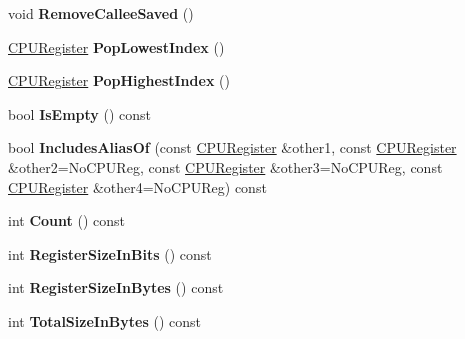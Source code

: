 \begin{DoxyCompactItemize}
\item 
void {\bfseries Remove\+Callee\+Saved} ()\hypertarget{classv8_1_1internal_1_1_c_p_u_reg_list_a2678bdb9c6393a3082b004124ca7b650}{}\label{classv8_1_1internal_1_1_c_p_u_reg_list_a2678bdb9c6393a3082b004124ca7b650}

\item 
\hyperlink{structv8_1_1internal_1_1_c_p_u_register}{C\+P\+U\+Register} {\bfseries Pop\+Lowest\+Index} ()\hypertarget{classv8_1_1internal_1_1_c_p_u_reg_list_a867b629b4d0a55fe464cf3c2daca8d3c}{}\label{classv8_1_1internal_1_1_c_p_u_reg_list_a867b629b4d0a55fe464cf3c2daca8d3c}

\item 
\hyperlink{structv8_1_1internal_1_1_c_p_u_register}{C\+P\+U\+Register} {\bfseries Pop\+Highest\+Index} ()\hypertarget{classv8_1_1internal_1_1_c_p_u_reg_list_a4f0b78f3f4844b520caba599d0860d81}{}\label{classv8_1_1internal_1_1_c_p_u_reg_list_a4f0b78f3f4844b520caba599d0860d81}

\item 
bool {\bfseries Is\+Empty} () const \hypertarget{classv8_1_1internal_1_1_c_p_u_reg_list_ac7b3fea9ac25a2f94e245eb264c23004}{}\label{classv8_1_1internal_1_1_c_p_u_reg_list_ac7b3fea9ac25a2f94e245eb264c23004}

\item 
bool {\bfseries Includes\+Alias\+Of} (const \hyperlink{structv8_1_1internal_1_1_c_p_u_register}{C\+P\+U\+Register} \&other1, const \hyperlink{structv8_1_1internal_1_1_c_p_u_register}{C\+P\+U\+Register} \&other2=No\+C\+P\+U\+Reg, const \hyperlink{structv8_1_1internal_1_1_c_p_u_register}{C\+P\+U\+Register} \&other3=No\+C\+P\+U\+Reg, const \hyperlink{structv8_1_1internal_1_1_c_p_u_register}{C\+P\+U\+Register} \&other4=No\+C\+P\+U\+Reg) const \hypertarget{classv8_1_1internal_1_1_c_p_u_reg_list_a0546665669cfa82df59de2611f737d8e}{}\label{classv8_1_1internal_1_1_c_p_u_reg_list_a0546665669cfa82df59de2611f737d8e}

\item 
int {\bfseries Count} () const \hypertarget{classv8_1_1internal_1_1_c_p_u_reg_list_ae73f91faefc58e15f84fc7b7feda10f9}{}\label{classv8_1_1internal_1_1_c_p_u_reg_list_ae73f91faefc58e15f84fc7b7feda10f9}

\item 
int {\bfseries Register\+Size\+In\+Bits} () const \hypertarget{classv8_1_1internal_1_1_c_p_u_reg_list_ac59b40b82ac0b0d65812ef6d1af2f03b}{}\label{classv8_1_1internal_1_1_c_p_u_reg_list_ac59b40b82ac0b0d65812ef6d1af2f03b}

\item 
int {\bfseries Register\+Size\+In\+Bytes} () const \hypertarget{classv8_1_1internal_1_1_c_p_u_reg_list_a0b86be40d0a6852138d39b4de5c1a931}{}\label{classv8_1_1internal_1_1_c_p_u_reg_list_a0b86be40d0a6852138d39b4de5c1a931}

\item 
int {\bfseries Total\+Size\+In\+Bytes} () const \hypertarget{classv8_1_1internal_1_1_c_p_u_reg_list_a379269cc432a40f1cc67def6b747bd2c}{}\label{classv8_1_1internal_1_1_c_p_u_reg_list_a379269cc432a40f1cc67def6b747bd2c}

\end{DoxyCompactItemize}
